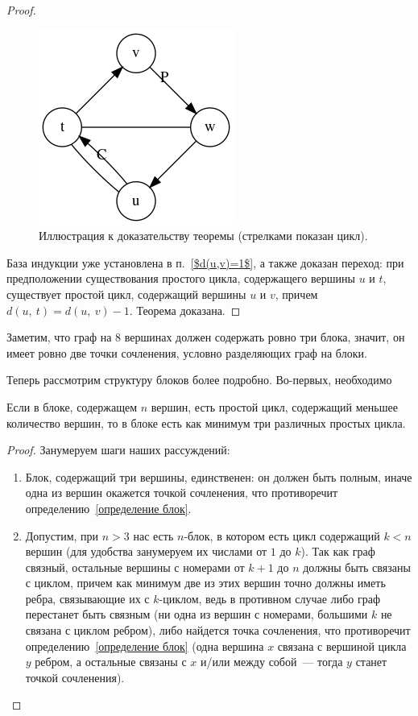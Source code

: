 \begin{solution}
\begin{proof}
\begin{figure}[H]
    \centering
    \includegraphics[scale=0.5]{Fall/img/solution-441_cycle_for_the_theorem.dot.png}
    \caption{Иллюстрация к доказательству теоремы (стрелками показан цикл).} \label{cycle for the theorem}
\end{figure}

База индукции уже установлена в п.~\ref{$d(u,v)=1$}, а также доказан переход: при предположении существования простого цикла, содержащего вершины $u$ и $t$, существует простой цикл, содержащий вершины $u$ и $v$, причем $d(u,~t) = d(u,~v) - 1$. Теорема доказана.
\end{proof}

Заметим, что граф на \(8\) вершинах должен содержать ровно три блока, значит, он имеет ровно две точки сочленения, условно разделяющих граф на блоки.

Теперь рассмотрим структуру блоков более подробно. Во-первых, необходимо

\begin{proposition}\label{k-цикл}
Если в блоке, содержащем $n$ вершин, есть простой цикл, содержащий меньшее количество вершин, то в блоке есть как минимум три различных простых цикла.
\end{proposition}
\begin{proof}
Занумеруем шаги наших рассуждений:
\begin{enumerate}
    \item Блок, содержащий три вершины, единственен: он должен быть полным, иначе одна из вершин окажется точкой сочленения, что противоречит определению~\ref{определение блок}.
    
    \item Допустим, при $n > 3$ нас есть $n$-блок, в котором есть цикл содержащий $k < n$ вершин (для удобства занумеруем их числами от \(1\) до \(k\)). Так как граф связный, остальные вершины с номерами от $k + 1$ до $n$ должны быть связаны с циклом, причем как минимум две из этих вершин точно должны иметь ребра, связывающие их с $k$-циклом, ведь в противном случае либо граф перестанет быть связным (ни одна из вершин с номерами, большими $k$ не связана с циклом ребром), либо найдется точка сочленения, что противоречит определению~\ref{определение блок} (одна вершина $x$ связана с вершиной цикла $y$ ребром, а остальные связаны с $x$ и/или между собой~--- тогда $y$ станет точкой сочленения).
    

\end{enumerate}
\end{proof}
\end{solution}
